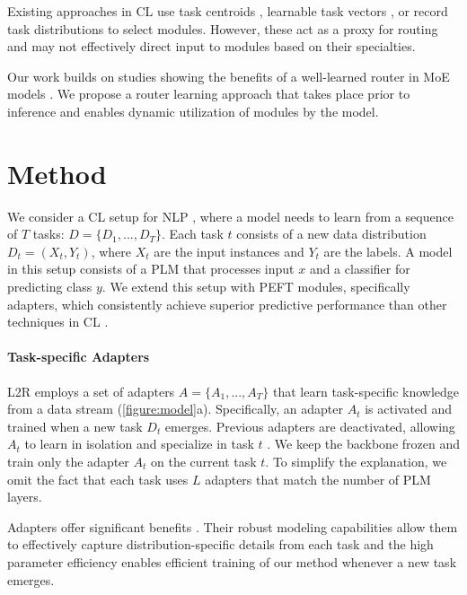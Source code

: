 \documentclass[11pt]{article}
\begin{document}
Existing approaches in CL use task centroids \cite{cheng2024dynamic}, learnable task vectors \cite{wang2024rehearsalfree}, or record task distributions \cite{wang-etal-2023-rehearsal} to select modules. However, these act as a proxy for routing and may not effectively direct input to modules based on their specialties.

Our work builds on studies showing the benefits of a well-learned router in MoE models \cite{dikkala-etal-2023-benefits}. We propose a router learning approach that takes place prior to inference and enables dynamic utilization of modules by the model.

\section{Method}
\label{sec:method}

We consider a CL setup for NLP \cite{NEURIPS2019_f8d2e80c}, where a model needs to learn from a sequence of $T$ tasks: $ D = \{D_1, ..., D_T \} $. Each task $t$ consists of a new data distribution $D_t = (X_t,Y_t)$, where $X_t$ are the input instances and $Y_t$ are the labels.
A model in this setup consists of a PLM that processes input $x$ and a classifier for predicting class $y$.
We extend this setup with PEFT modules, specifically adapters, which consistently achieve superior predictive performance than other techniques in CL \cite{wistuba2024choice}.

\paragraph{Task-specific Adapters}
L2R employs a set of adapters $ A = \{A_1, ..., A_T \} $ that learn task-specific knowledge from a data stream (\autoref{figure:model}a). Specifically, an adapter $A_t$ is activated and trained when a new task $D_t$ emerges. Previous adapters are deactivated, allowing $A_t$ to learn in isolation and specialize in task $t$ \cite{wang-etal-2023-rehearsal}. We keep the backbone frozen and train only the adapter $A_t$ on the current task $t$.
To simplify the explanation, we omit the fact that each task uses $L$ adapters that match the number of PLM layers.

Adapters offer significant benefits \cite{wistuba2024choice}. Their robust modeling capabilities allow them to effectively capture distribution-specific details from each task and the high parameter efficiency enables efficient training of our method whenever a new task emerges. 
\end{document}
